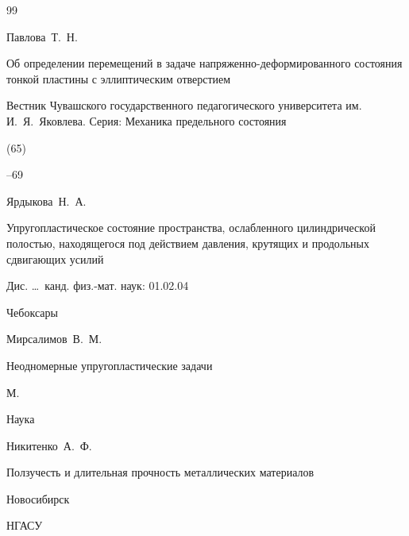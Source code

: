 \begin{thebibliography}{99}

\by Павлова~Т.~Н.

\paper Об определении перемещений в задаче напряженно-деформированного состояния тонкой пластины с эллиптическим отверстием

\jour Вестник Чувашского государственного педагогического университета им. И.~Я.~Яковлева. Серия: Механика предельного состояния


(65)

--69







\by Ярдыкова~Н.~А.

\thesis Упругопластическое состояние пространства, ослабленного цилиндрической полостью, находящегося под действием давления, крутящих и продольных сдвигающих усилий 

\thesisinfo Дис. \dots\ канд. физ.-мат. наук: 01.02.04

\publaddr Чебоксары







\by Мирсалимов~В.~М.

\book Неодномерные упругопластические задачи

\publaddr М.

\publ Наука







\by Никитенко~А.~Ф.

\book Ползучесть и длительная прочность металлических материалов

\publaddr Новосибирск

\publ НГАСУ







\end{thebibliography}
